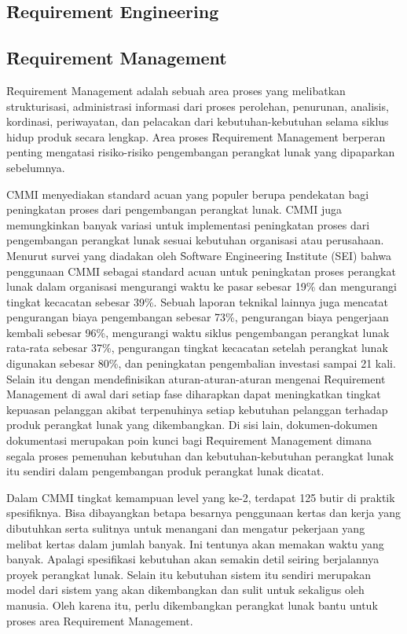\subsection{\f{Requirement Engineering}}

\subsection{\f{Requirement Management}}

\f{Requirement Management} adalah sebuah area proses yang melibatkan strukturisasi, administrasi informasi dari proses perolehan, penurunan, analisis, kordinasi, periwayatan, dan pelacakan dari kebutuhan-kebutuhan selama siklus hidup produk secara lengkap\cite{reqm.requirements}. Area proses \f{Requirement Management} berperan penting mengatasi risiko-risiko pengembangan perangkat lunak yang dipaparkan sebelumnya. 

CMMI menyediakan standard acuan yang populer berupa pendekatan bagi peningkatan proses dari pengembangan perangkat lunak. CMMI juga memungkinkan banyak variasi untuk implementasi peningkatan proses dari pengembangan perangkat lunak sesuai kebutuhan organisasi atau perusahaan. Menurut survei yang diadakan oleh \f{Software Engineering Institute} (SEI) bahwa penggunaan CMMI sebagai standard acuan untuk peningkatan proses perangkat lunak dalam organisasi mengurangi waktu ke pasar sebesar 19\% dan mengurangi tingkat kecacatan sebesar 39\%. Sebuah laporan teknikal lainnya juga mencatat pengurangan biaya pengembangan sebesar 73\%, pengurangan biaya pengerjaan kembali sebesar 96\%, mengurangi waktu siklus pengembangan perangkat lunak rata-rata sebesar 37\%, pengurangan tingkat kecacatan setelah perangkat lunak digunakan sebesar 80\%, dan peningkatan pengembalian investasi sampai 21 kali\cite{reqm.collaborative}. Selain itu dengan mendefinisikan aturan-aturan-aturan mengenai \f{Requirement Management} di awal dari setiap fase diharapkan dapat meningkatkan tingkat kepuasan pelanggan akibat terpenuhinya setiap kebutuhan pelanggan terhadap produk perangkat lunak yang dikembangkan. Di sisi lain, dokumen-dokumen dokumentasi merupakan poin kunci bagi \f{Requirement Management} dimana segala proses pemenuhan kebutuhan dan kebutuhan-kebutuhan perangkat lunak itu sendiri dalam pengembangan produk perangkat lunak dicatat. 

Dalam CMMI tingkat kemampuan level yang ke-2, terdapat 125 butir di praktik spesifiknya\cite{reqm.collaborative}. Bisa dibayangkan betapa besarnya penggunaan kertas dan kerja yang dibutuhkan serta sulitnya untuk  menangani dan mengatur pekerjaan yang melibat kertas dalam jumlah banyak. Ini tentunya akan memakan waktu yang banyak. Apalagi spesifikasi kebutuhan akan semakin detil seiring berjalannya proyek perangkat lunak. Selain itu kebutuhan sistem itu sendiri merupakan model dari sistem yang akan dikembangkan dan sulit untuk sekaligus oleh manusia. Oleh karena itu, perlu dikembangkan perangkat lunak bantu untuk proses area Requirement Management.

